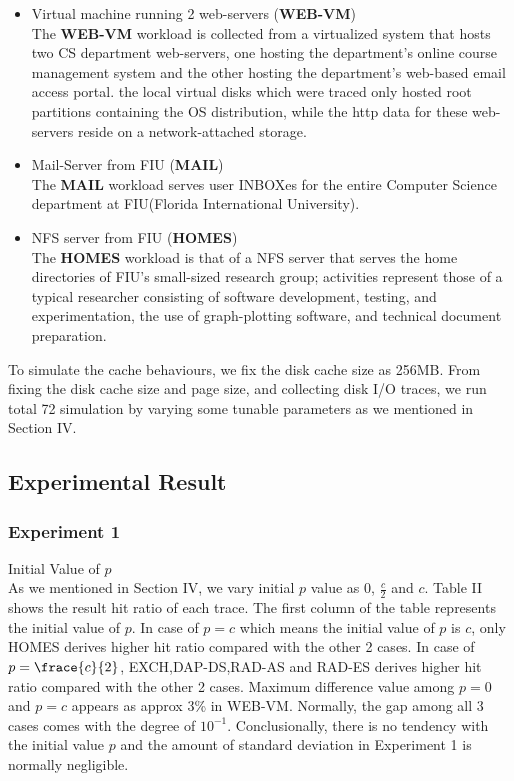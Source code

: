 \begin{itemize}
\item Virtual machine running 2 web-servers (\textbf{WEB-VM}) \\
The \textbf{WEB-VM} workload is collected from a virtualized system that hosts two CS
department web-servers, one hosting the department's online course management system
and the other hosting the department's web-based email access portal. the local virtual disks
which were traced only hosted root partitions containing the OS distribution, while the http data for these web-servers reside on a network-attached storage.
\end{itemize}

\begin{itemize}
\item Mail-Server from FIU (\textbf{MAIL}) \\
The \textbf{MAIL} workload serves user INBOXes for the entire Computer Science department at FIU(Florida International University).
\end{itemize}

\begin{itemize}
\item NFS server from FIU (\textbf{HOMES}) \\
The \textbf{HOMES} workload is that of a NFS server that serves the home directories of FIU's small-sized research group; activities represent those of a typical researcher consisting of software development, testing, and experimentation, the use of graph-plotting software, and technical document preparation.
\end{itemize}

To simulate the cache behaviours, we fix the disk cache size as 256MB. From fixing the disk cache size and page size, and collecting disk I/O traces, we run total 72 simulation by varying some tunable parameters as we mentioned in Section IV. 


\subsection{Experimental Result}\label{expresult}



\subsubsection{Experiment 1} Initial Value of $p$ \\
 As we mentioned in Section IV, we vary initial $p$ value as 0, $\frac{c}{2}$ and $c$. Table II shows the result hit ratio of each trace. The first column of the table represents the initial value of $p$. In case of $p=c$ which means the initial value of $p$ is $c$, only HOMES derives higher hit ratio compared with the other 2 cases. In case of $p=\frace{c}{2}$, EXCH,DAP-DS,RAD-AS and RAD-ES derives higher hit ratio compared with the other 2 cases. Maximum difference value among $p=0$ and $p=c$ appears as approx 3\% in WEB-VM. Normally, the gap among all 3 cases comes with the degree of $10^{-1}$. Conclusionally, there is no tendency with the initial value $p$ and the amount of standard deviation in Experiment 1 is normally negligible.
\vspace{0.2cm}

